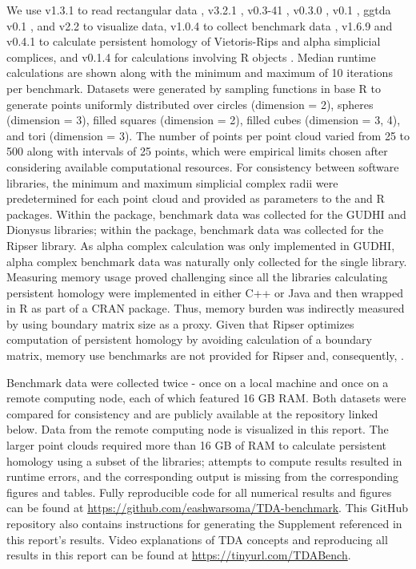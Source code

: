 We use  v1.3.1 to read rectangular data \citep{readr},
 v3.2.1 \citep{ggplot2}, 
v0.3-41 \citep{scatterplot3d},  v0.3.0
\citep{recexcavAAR},  v0.1 \citep{deldir}, ggtda v0.1
\citep{ggtda}, and  v2.2 \citep{magick} to visualize
data,  v1.0.4 to collect benchmark data \citep{bench},
 v1.6.9 \citep{TDA} and  v0.4.1
\citep{TDAstats} to calculate persistent homology of Vietoris-Rips and
alpha simplicial complices, and  v0.1.4 for calculations
involving R objects \citep{pryr}. Median runtime calculations are shown
along with the minimum and maximum of 10 iterations per benchmark.
Datasets were generated by sampling functions in base R to generate
points uniformly distributed over circles (dimension = 2), spheres
(dimension = 3), filled squares (dimension = 2), filled cubes (dimension
= 3, 4), and tori (dimension = 3). The number of points per point cloud
varied from 25 to 500 along with intervals of 25 points, which were empirical
limits chosen after considering available computational resources. For
consistency between software libraries, the minimum and maximum
simplicial complex radii were predetermined for each point cloud and
provided as parameters to the  and  R
packages. Within the  package, benchmark data was collected
for the GUDHI \citep{gudhi} and Dionysus \citep{Dionysus} libraries;
within the  package, benchmark data was collected for
the Ripser \citep{Ripser} library. As alpha complex calculation was only
implemented in GUDHI, alpha complex benchmark data was naturally only
collected for the single library. Measuring memory usage proved
challenging since all the libraries calculating persistent homology were
implemented in either C++ or Java and then wrapped in R as part of a
CRAN package. Thus, memory burden was indirectly measured by using
boundary matrix size as a proxy. Given that Ripser optimizes computation
of persistent homology by avoiding calculation of a boundary matrix,
memory use benchmarks are not provided for Ripser and, consequently,
.

Benchmark data were collected twice - once on a local machine and once on
a remote computing node, each of which featured 16 GB RAM. Both datasets
were compared for consistency and are publicly available at the
repository linked below. Data from the remote computing node is
visualized in this report. The larger point clouds required more than 16
GB of RAM to calculate persistent homology using a subset of the
libraries; attempts to compute results resulted in runtime errors, and
the corresponding output is missing from the corresponding figures and
tables. Fully reproducible code for all numerical results and figures
can be found at \url{https://github.com/eashwarsoma/TDA-benchmark}. This
GitHub repository also contains instructions for generating the
Supplement referenced in this report's results. Video explanations of
TDA concepts and reproducing all results in this report can be found at
\url{https://tinyurl.com/TDABench}.

